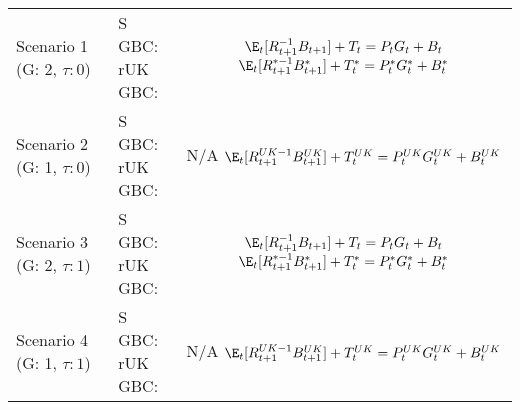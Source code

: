 \renewcommand{\arraystretch}{2}
\begin{table}[H]
    \centering
    \begin{tabular}{l|l c}
    \makecell{Scenario 1 \\ (G: 2, $\tau: 0$)} &  \makecell{S GBC: \\ rUK GBC:} & 
        \makecell{
            $\E_t [{R^{-1}_{t+1}}B_{t+1}] + T_t = P_tG_t + B_t$\\
            $\E_t [{R^{*-1}_{t+1}}B^*_{t+1}] + T^*_t = P^*_tG^*_t + B^*_t$
        }  \\ 
    \makecell{Scenario 2 \\ (G: 1, $\tau: 0$)} &  \makecell{S GBC: \\ rUK GBC:} & 
        \makecell{
            N/A\\
            $\E_t [{R^{UK-1}_{t+1}}B^{UK}_{t+1}] + T^{UK}_t = P^{UK}_tG^{UK}_t + B^{UK}_t$
        }   \\ 
    \makecell{Scenario 3 \\ (G: 2, $\tau: 1$)} &  \makecell{S GBC: \\ rUK GBC:} & 
    \makecell{
        $\E_t [{R^{-1}_{t+1}}B_{t+1}] + T_t = P_tG_t + B_t$\\ 
        $\E_t [{R^{*-1}_{t+1}}B^*_{t+1}] + T^*_t = P^*_tG^*_t + B^*_t$
    }  \\
    \makecell{Scenario 4 \\ (G: 1, $\tau: 1$)} &  \makecell{S GBC: \\ rUK GBC:} & 
    \makecell{
        N/A \\
        $\E_t [{R^{UK-1}_{t+1}}B^{UK}_{t+1}] + T^{UK}_t = P^{UK}_tG^{UK}_t + B^{UK}_t$
    }  
    \end{tabular}
    \end{table}
\restoregeometry

